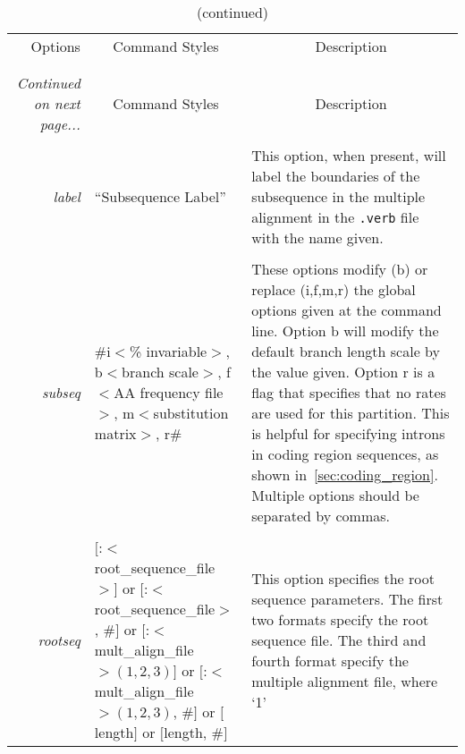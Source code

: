 \documentclass[10pt]{article}
\begin{document}
\begin{small}
\begin{longtable}{rp{5.5cm}p{7cm}}
\caption{{\normalsize Subsequence options.}}
\endfirsthead
\caption[]{{\normalsize (continued)}}\\
\hline
\multicolumn{1}{|r}{{\normalsize Options}} & \multicolumn{1}{c}{{\normalsize Command Styles}} & \multicolumn{1}{c|}{\normalsize Description} \\
\hline
\\
\endhead
\hline\\
{\it \normalsize Continued on next page...}
\endfoot
\endlastfoot
\hline
\multicolumn{1}{|r}{\normalsize Options} & \multicolumn{1}{c}{\normalsize Command Styles} & \multicolumn{1}{c|}{\normalsize Description} \\
\hline
\\
{\it label}   & ``Subsequence Label'' & This option, when present, will label the
boundaries of the subsequence in the multiple alignment in the {\tt *.verb} file with the name
given. \\
\\
{\it subseq}  & \parbox[t]{5.4cm}{
  \#i$<$\% invariable$>$,\\
  b$<$branch scale$>$,\\
  f$<$AA frequency file$>$,\\
  m$<$substitution matrix$>$,\\
  r\#
} & These options modify (b) or replace (i,f,m,r) the global options given at the command
line. Option b will modify the default branch length scale by the value given. Option r is a flag that specifies that no rates are used for this partition. This is helpful for specifying introns in coding region sequences, as shown in~\ref{sec:coding_region}. Multiple options should be separated by commas.\\
\\
{\it rootseq} & \parbox[t]{5.4cm}{
  $\mathtt{[}$:$<$root\_sequence\_file$>\mathtt{]}$ or \\
  $\mathtt{[}$:$<$root\_sequence\_file$>$, \#$\mathtt{]}$ or \\
  $\mathtt{[}$:$<$mult\_align\_file$>(1,2,3)\mathtt{]}$ or \\
  $\mathtt{[}$:$<$mult\_align\_file$>(1,2,3)$, \#$\mathtt{]}$ or \\
  $\mathtt{[}$length$\mathtt{]}$ or \\
  $\mathtt{[}$length, \#$\mathtt{]}$
} & This option specifies the root sequence parameters.  The first two formats specify
the root sequence file. The third and fourth format specify the multiple alignment file, where `1'

\end{longtable}
\end{small}
\end{document}
